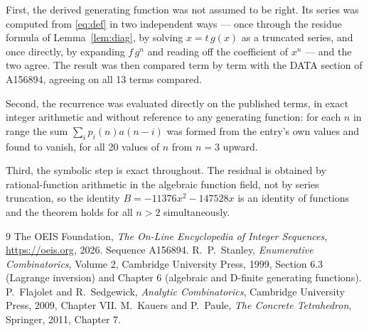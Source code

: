 \documentclass[11pt,a4paper]{article}
\theoremstyle{plain}
\theoremstyle{definition}
\begin{document}
First, the derived generating function was not assumed to be right. Its series was
computed from \eqref{eq:def} in two independent ways --- once through the residue formula
of Lemma~\ref{lem:diag}, by solving $x=t\,g(x)$ as a truncated series, and once directly,
by expanding $f\,g^{n}$ and reading off the coefficient of $x^{n}$ --- and the two agree.
The result was then compared term by term with the DATA section of A156894, agreeing on
all 13 terms compared.

Second, the recurrence was evaluated directly on the published terms, in exact integer
arithmetic and without reference to any generating function: for each $n$ in range the sum
$\sum_{i}p_{i}(n)a(n-i)$ was formed from the entry's own values and found to vanish, for
all 20 values of $n$ from $n=3$ upward.

Third, the symbolic step is exact throughout. The residual is obtained by
rational-function arithmetic in the algebraic function field, not by series truncation, so
the identity $B=- 11376 x^{2} - 147528 x$ is an identity of functions and the theorem holds for all
$n>2$ simultaneously.

\begin{thebibliography}{9}
 The OEIS Foundation, \emph{The On-Line Encyclopedia of Integer Sequences},
\url{https://oeis.org}, 2026. Sequence A156894.
 R.~P.~Stanley, \emph{Enumerative Combinatorics}, Volume 2, Cambridge
University Press, 1999, Section 6.3 (Lagrange inversion) and Chapter 6 (algebraic and
D-finite generating functions).
 P.~Flajolet and R.~Sedgewick, \emph{Analytic Combinatorics}, Cambridge
University Press, 2009, Chapter VII.
 M.~Kauers and P.~Paule, \emph{The Concrete Tetrahedron}, Springer, 2011,
Chapter 7.
\end{thebibliography}
\end{document}
